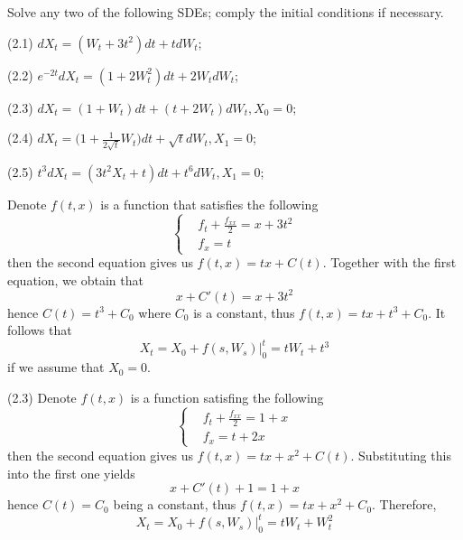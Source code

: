     \problem
    \begin{question}
        Solve any two of the following SDEs; comply the initial conditions if necessary.

        (2.1) $dX_t=(W_t+3t^2)dt+tdW_t$;

        (2.2) $e^{-2t}dX_t=(1+2W_t^2)dt+2W_tdW_t$;

        (2.3) $dX_t=(1+W_t)dt+(t+2W_t)dW_t,X_0=0$;

        (2.4) $dX_t=\Big(1+\frac{1}{2\sqrt t}W_t\Big)dt+\sqrt t dW_t, X_1=0$;

        (2.5) $t^3dX_t=(3t^2X_t+t)dt+t^6dW_t,X_1=0$;
    \end{question}
    \begin{subproblem}[(2.\arabic*)]
        \item
        Denote $f(t,x)$ is a function that satisfies the following
        \[\left\{\begin{aligned}
            &f_t+\frac{f_{xx}}{2}=x+3t^2\\
            &f_x=t
        \end{aligned}\right.\]
        then the second equation gives us $f(t,x)=tx+C(t)$.
        Together with the first equation, we obtain that
        \[x+C'(t)=x+3t^2\]
        hence $C(t)=t^3+C_0$ where $C_0$ is a constant,
        thus $f(t,x)=tx+t^3+C_0$. 
        It follows that
        \[X_t=X_0+f(s,W_s)|_0^t=tW_t+t^3\]
        if we assume that $X_0=0$.

        \item[(2.3)]
        Denote $f(t,x)$ is a function satisfing the following
        \[\left\{\begin{aligned}
            &f_t+\frac{f_{xx}}{2}=1+x\\
            &f_x=t+2x
        \end{aligned}\right.\]
        then the second equation gives us $f(t,x)=tx+x^2+C(t)$.
        Substituting this into the first one yields
        \[x+C'(t)+1=1+x\]
        hence $C(t)=C_0$ being a constant, thus $f(t,x)=tx+x^2+C_0$.
        Therefore,
        \[X_t=X_0+f(s,W_s)|_0^t=tW_t+W_t^2\]
    \end{subproblem}

